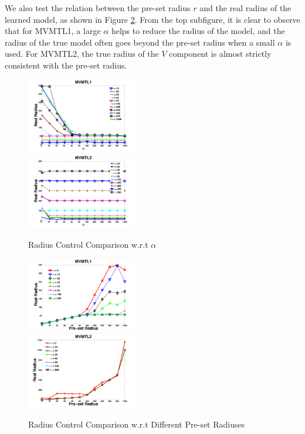 \documentclass[twoside,leqno,twocolumn]{article}
\begin{document}
We also test the relation between the pre-set radius $r$ and the real radius of the learned model, as shown in Figure \ref{fig:v-radius}. From the top subfigure, it is clear to observe that for MVMTL1, a large $\alpha$ helps to reduce the radius of the model, and the radius of the true model often goes beyond the pre-set radius when a small $\alpha$ is used. For MVMTL2, the true radius of the $V$ component is almost strictly consistent with the pre-set radius.  
%
\begin{figure}[h]
\centering
\begin{minipage}{1\textwidth}
\includegraphics[width= .5\textwidth, height=1.3in]{figures/alpha_mvmtl1.pdf}\\
\includegraphics[width= .5\textwidth, height=1.3in]{figures/alpha_mvmtl2.pdf}
\end{minipage}
\caption{Radius Control Comparison w.r.t $\alpha$}
\label{fig:v-alpha}
\end{figure}
%
\begin{figure}
\begin{center}
\begin{minipage}{1\textwidth}
\includegraphics[width= .5\textwidth, height=1.3in]{figures/radius_mvmtl1.pdf}\\
\includegraphics[width= .5\textwidth, height=1.3in]{figures/radius_mvmtl2.pdf}
\end{minipage}
\end{center}
\caption{Radius Control Comparison w.r.t Different Pre-set Radiuses}
\label{fig:v-radius}
\end{figure}
%
\end{document}

